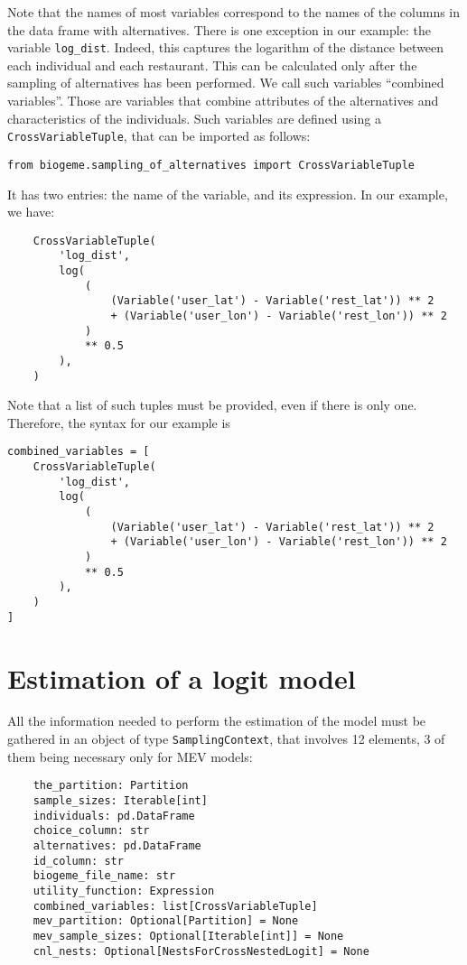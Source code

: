 \documentclass[12pt,a4paper]{article}
\begin{document}
  Note that the names of most variables correspond to the names of the
  columns in the data frame with alternatives. There is one exception in our example:
  the variable \lstinline+log_dist+. Indeed, this captures the
  logarithm of the distance between each individual and each
  restaurant. This can be calculated only after the sampling of
  alternatives has been performed. We call such variables ``combined variables''.
  Those are variables that combine attributes of the alternatives and characteristics of the individuals. Such variables are defined using a \lstinline+CrossVariableTuple+, that can be imported as follows:
  \begin{lstlisting}
from biogeme.sampling_of_alternatives import CrossVariableTuple
  \end{lstlisting}
  It has two entries: the name of the variable, and its expression. In our example, we have:
  \begin{lstlisting}
    CrossVariableTuple(
        'log_dist',
        log(
            (
                (Variable('user_lat') - Variable('rest_lat')) ** 2
                + (Variable('user_lon') - Variable('rest_lon')) ** 2
            )
            ** 0.5
        ),
    )
  \end{lstlisting}
  Note that a list of such tuples must be provided, even if there is only one. Therefore, the syntax for our example is
  \begin{lstlisting}
combined_variables = [
    CrossVariableTuple(
        'log_dist',
        log(
            (
                (Variable('user_lat') - Variable('rest_lat')) ** 2
                + (Variable('user_lon') - Variable('rest_lon')) ** 2
            )
            ** 0.5
        ),
    )
]
  \end{lstlisting}
  
\section{Estimation of a logit model}
\label{sec:logit}
All the information needed to perform the estimation of the model must be gathered in an object of type \lstinline+SamplingContext+, that involves 12 elements, 3 of them being necessary only for MEV models:
\begin{lstlisting}
    the_partition: Partition
    sample_sizes: Iterable[int]
    individuals: pd.DataFrame
    choice_column: str
    alternatives: pd.DataFrame
    id_column: str
    biogeme_file_name: str
    utility_function: Expression
    combined_variables: list[CrossVariableTuple]
    mev_partition: Optional[Partition] = None
    mev_sample_sizes: Optional[Iterable[int]] = None
    cnl_nests: Optional[NestsForCrossNestedLogit] = None
\end{lstlisting}
\end{document}
